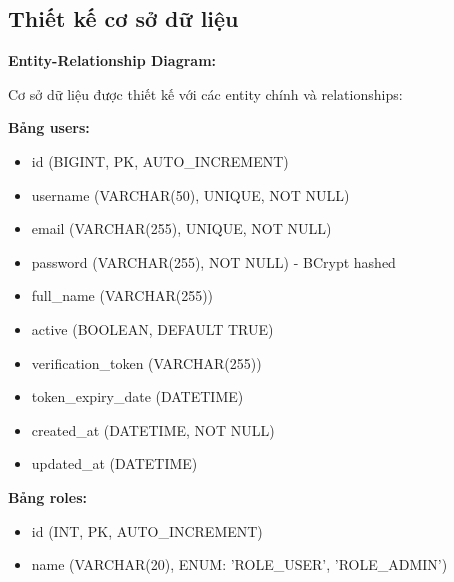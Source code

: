 \documentclass[../DoAn.tex]{subfiles}
\begin{document}


\subsection{Thiết kế cơ sở dữ liệu}

\textbf{Entity-Relationship Diagram:}

Cơ sở dữ liệu được thiết kế với các entity chính và relationships:

\textbf{Bảng users:}
\begin{itemize}
    \item id (BIGINT, PK, AUTO\_INCREMENT)
    \item username (VARCHAR(50), UNIQUE, NOT NULL)
    \item email (VARCHAR(255), UNIQUE, NOT NULL)
    \item password (VARCHAR(255), NOT NULL) - BCrypt hashed
    \item full\_name (VARCHAR(255))
    \item active (BOOLEAN, DEFAULT TRUE)
    \item verification\_token (VARCHAR(255))
    \item token\_expiry\_date (DATETIME)
    \item created\_at (DATETIME, NOT NULL)
    \item updated\_at (DATETIME)
\end{itemize}

\textbf{Bảng roles:}
\begin{itemize}
    \item id (INT, PK, AUTO\_INCREMENT)
    \item name (VARCHAR(20), ENUM: 'ROLE\_USER', 'ROLE\_ADMIN')
\end{itemize}
\end{document}
